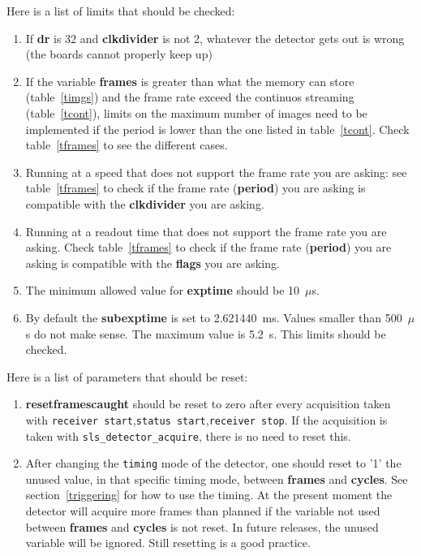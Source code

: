 \documentclass{article}
\begin{document}
Here is a list of limits that should be checked:
\begin{enumerate}
\item 
If \textbf{dr} is 32 and \textbf{clkdivider} is not 2, whatever the detector gets out is wrong (the boards cannot properly keep up) 
\item If the variable \textbf{frames} is greater than what the memory can store (table~\ref{timgs}) and the frame rate exceed the continuos streaming (table~\ref{tcont}), limits on the maximum number of images need to be implemented if the period is lower than the one listed in table~\ref{tcont}. Check table~\ref{tframes} to see the different cases.
\item Running at a speed that does not support the frame rate you are asking: see table~\ref{tframes} to check if the frame rate (\textbf{period}) you are asking is compatible with the \textbf{clkdivider} you are asking.
\item Running at a readout time that does not support the frame rate you are asking. Check table~\ref{tframes} to check if the frame rate (\textbf{period}) you are asking is compatible with the \textbf{flags} you are asking.
\item The minimum allowed value for \textbf{exptime} should be 10~$\mu$s. 
\item By default the {\textbf{subexptime}} is set to 2.621440~ms. Values smaller than 500~$\mu$s do not make sense. The maximum value is 5.2~s. This limits should be checked.
\end{enumerate}

Here is a list of parameters that should be reset:
\begin{enumerate}
\item  \textbf{resetframescaught} should be reset to zero after every acquisition taken with {\tt{receiver start}},{\tt{status start}},{\tt{receiver stop}}. If the acquisition is taken with {\tt{sls\_detector\_acquire}}, there is no need to reset this.
\item After changing the {\tt{timing}} mode of the detector, one should reset to '1' the unused value, in that specific timing mode, between \textbf{frames} and \textbf{cycles}. See section~\ref{triggering} for how to use the timing. At the present moment the detector will acquire more frames than planned if the variable not used between \textbf{frames} and \textbf{cycles} is not reset. In future releases, the unused variable will be ignored. Still resetting is a good practice.
      
\end{enumerate}
\end{document}

